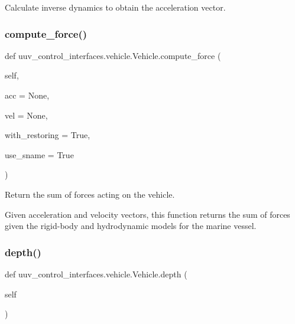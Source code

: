 \begin{DoxyVerb}Calculate inverse dynamics to obtain the acceleration vector.\end{DoxyVerb}
 \mbox{\label{classuuv__control__interfaces_1_1vehicle_1_1Vehicle_a35f52975f88fb4861a41351db7f8f4a6}} 
\subsubsection{\texorpdfstring{compute\+\_\+force()}{compute\_force()}}
{\footnotesize\ttfamily def uuv\+\_\+control\+\_\+interfaces.\+vehicle.\+Vehicle.\+compute\+\_\+force (\begin{DoxyParamCaption}\item[{}]{self,  }\item[{}]{acc = {\ttfamily None},  }\item[{}]{vel = {\ttfamily None},  }\item[{}]{with\+\_\+restoring = {\ttfamily True},  }\item[{}]{use\+\_\+sname = {\ttfamily True} }\end{DoxyParamCaption})}

\begin{DoxyVerb}Return the sum of forces acting on the vehicle.

Given acceleration and velocity vectors, this function returns the
sum of forces given the rigid-body and hydrodynamic models for the
marine vessel.
\end{DoxyVerb}
 \mbox{\label{classuuv__control__interfaces_1_1vehicle_1_1Vehicle_a4473987f3301790f817b955c6755c34c}} 
\subsubsection{\texorpdfstring{depth()}{depth()}}
{\footnotesize\ttfamily def uuv\+\_\+control\+\_\+interfaces.\+vehicle.\+Vehicle.\+depth (\begin{DoxyParamCaption}\item[{}]{self }\end{DoxyParamCaption})}

